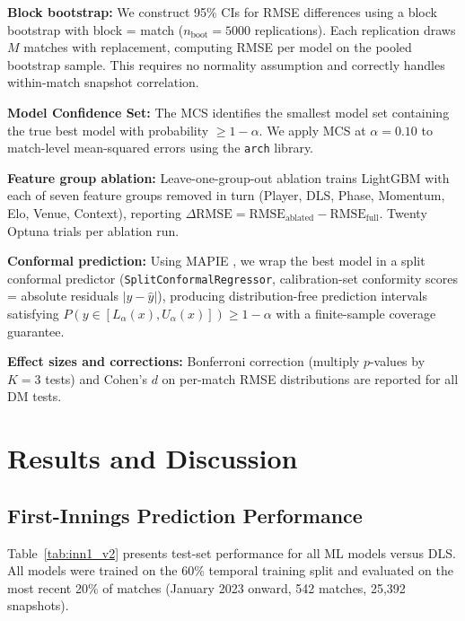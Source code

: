 \documentclass[10pt,a4paper,twocolumn]{article}
\begin{document}
\textbf{Block bootstrap:} We construct 95\% CIs for RMSE differences using a block bootstrap with block = match ($n_\text{boot} = 5000$ replications). Each replication draws $M$ matches with replacement, computing RMSE per model on the pooled bootstrap sample. This requires no normality assumption and correctly handles within-match snapshot correlation.

\textbf{Model Confidence Set:} The MCS \citep{hansen2011model} identifies the smallest model set containing the true best model with probability $\geq 1-\alpha$. We apply MCS at $\alpha=0.10$ to match-level mean-squared errors using the \texttt{arch} library.

\textbf{Feature group ablation:} Leave-one-group-out ablation trains LightGBM with each of seven feature groups removed in turn (Player, DLS, Phase, Momentum, Elo, Venue, Context), reporting $\Delta\text{RMSE} = \text{RMSE}_\text{ablated} - \text{RMSE}_\text{full}$. Twenty Optuna trials per ablation run.

\textbf{Conformal prediction:} Using MAPIE \citep{taquet2022mapie}, we wrap the best model in a split conformal predictor (\texttt{SplitConformalRegressor}, calibration-set conformity scores = absolute residuals $|y - \hat{y}|$), producing distribution-free prediction intervals satisfying $P(y \in [L_\alpha(x), U_\alpha(x)]) \geq 1-\alpha$ with a finite-sample coverage guarantee.

\textbf{Effect sizes and corrections:} Bonferroni correction (multiply $p$-values by $K=3$ tests) and Cohen's $d$ on per-match RMSE distributions are reported for all DM tests.

\section{Results and Discussion}
\label{sec:results}

\subsection{First-Innings Prediction Performance}

Table~\ref{tab:inn1_v2} presents test-set performance for all ML models versus DLS. All models were trained on the 60\% temporal training split and evaluated on the most recent 20\% of matches (January 2023 onward, 542 matches, 25,392 snapshots).
\end{document}
